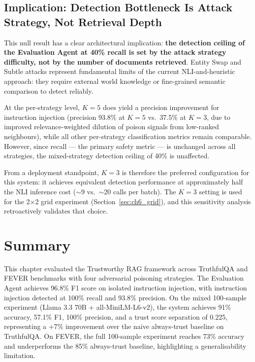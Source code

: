 \subsection{Implication: Detection Bottleneck Is Attack Strategy, Not Retrieval Depth}

This null result has a clear architectural implication: \textbf{the detection ceiling of the
Evaluation Agent at 40\% recall is set by the attack strategy difficulty, not by the number
of documents retrieved}. Entity Swap and Subtle attacks represent fundamental limits of the
current NLI-and-heuristic approach: they require external world knowledge or fine-grained
semantic comparison to detect reliably.

At the per-strategy level, $K=5$ does yield a precision improvement for instruction
injection (precision 93.8\% at $K=5$ vs.\ 37.5\% at $K=3$, due to improved
relevance-weighted dilution of poison signals from low-ranked neighbours), while all other
per-strategy classification metrics remain comparable. However, since recall --- the primary
safety metric --- is unchanged across all strategies, the mixed-strategy detection ceiling
of 40\% is unaffected.

From a deployment standpoint, $K=3$ is therefore the preferred configuration for this
system: it achieves equivalent detection performance at approximately half the NLI inference
cost ($\sim$9 vs.\ $\sim$20 calls per batch). The $K=3$ setting is used for the 2×2 grid
experiment (Section~\ref{sec:ch6_grid}), and this sensitivity analysis retroactively
validates that choice.

\section{Summary}

This chapter evaluated the Trustworthy RAG framework across TruthfulQA and FEVER
benchmarks with four adversarial poisoning strategies. The Evaluation Agent achieves
96.8\% F1 score on isolated instruction injection, with instruction injection detected
at 100\% recall and 93.8\% precision.
On the mixed 100-sample experiment (Llama 3.3 70B + all-MiniLM-L6-v2), the system
achieves 91\% accuracy, 57.1\% F1, 100\% precision, and a trust score separation of
0.225, representing a +7\% improvement over the naive always-trust baseline on
TruthfulQA. On FEVER, the full 100-sample experiment reaches 73\% accuracy and
underperforms the 85\% always-trust baseline, highlighting a generalisability limitation.

